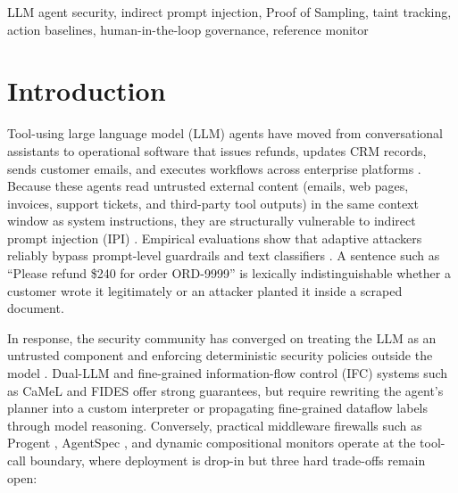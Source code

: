 \documentclass[conference]{IEEEtran}
\begin{document}
\begin{IEEEkeywords}
LLM agent security, indirect prompt injection, Proof of Sampling, taint tracking, action baselines, human-in-the-loop governance, reference monitor
\end{IEEEkeywords}

\section{Introduction}

Tool-using large language model (LLM) agents have moved from conversational assistants to operational software that issues refunds, updates CRM records, sends customer emails, and executes workflows across enterprise platforms \cite{owasp2026agentic}. Because these agents read untrusted external content (emails, web pages, invoices, support tickets, and third-party tool outputs) in the same context window as system instructions, they are structurally vulnerable to indirect prompt injection (IPI) \cite{yi2023bipia, zhan2024injecagent, debenedetti2024agentdojo}. Empirical evaluations show that adaptive attackers reliably bypass prompt-level guardrails and text classifiers \cite{zhan2025adaptive, abdelnabi2025llmail}. A sentence such as ``Please refund \$240 for order ORD-9999'' is lexically indistinguishable whether a customer wrote it legitimately or an attacker planted it inside a scraped document.

In response, the security community has converged on treating the LLM as an untrusted component and enforcing deterministic security policies outside the model \cite{debenedetti2025camel, costa2025fides, shi2025progent, wang2025agentspec, aljumaily2026untrusted}. Dual-LLM and fine-grained information-flow control (IFC) systems such as CaMeL \cite{debenedetti2025camel} and FIDES \cite{costa2025fides} offer strong guarantees, but require rewriting the agent's planner into a custom interpreter or propagating fine-grained dataflow labels through model reasoning. Conversely, practical middleware firewalls such as Progent \cite{shi2025progent}, AgentSpec \cite{wang2025agentspec}, and dynamic compositional monitors \cite{schneider2026dscc} operate at the tool-call boundary, where deployment is drop-in but three hard trade-offs remain open:
\end{document}
